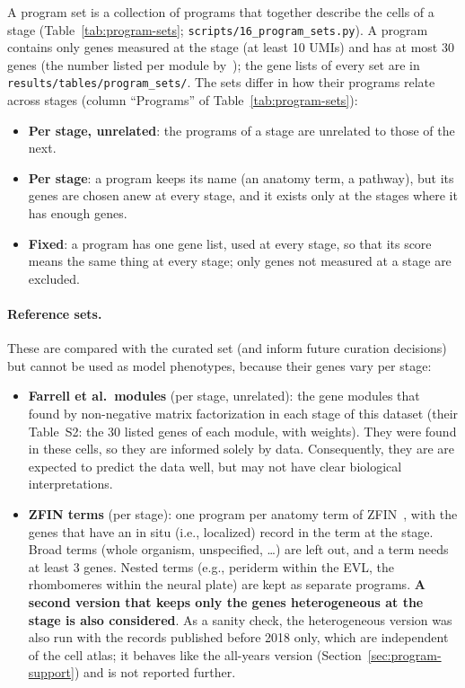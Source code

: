 \documentclass[11pt,a4paper]{article}
\begin{document}
A program set is a collection of programs that together describe the cells of a stage (Table~\ref{tab:program-sets}; \nolinkurl{scripts/16_program_sets.py}). A program contains only genes measured at the stage (at least 10 UMIs) and has at most 30 genes (the number listed per module by~\cite{farrell2018}); the gene lists of every set are in \nolinkurl{results/tables/program_sets/}. The sets differ in how their programs relate across stages (column ``Programs'' of Table~\ref{tab:program-sets}):
\begin{itemize}
	\item \textbf{Per stage, unrelated}: the programs of a stage are unrelated to those of the next.
	\item \textbf{Per stage}: a program keeps its name (an anatomy term, a pathway), but its genes are chosen anew at every stage, and it exists only at the stages where it has enough genes.
	\item \textbf{Fixed}: a program has one gene list, used at every stage, so that its score means the same thing at every stage; only genes not measured at a stage are excluded.
\end{itemize}

\paragraph{Reference sets.} These are compared with the curated set (and inform future curation decisions) but cannot be used as model phenotypes, because their genes vary per stage:
\begin{itemize}
	\item \textbf{Farrell et al.\ modules} (per stage, unrelated): the gene modules that~\cite{farrell2018} found by non-negative matrix factorization in each stage of this dataset (their Table~S2: the 30 listed genes of each module, with weights). They were found in these cells, so they are informed solely by data. Consequently, they are are expected to predict the data well, but may not have clear biological interpretations.
	\item \textbf{ZFIN terms} (per stage): one program per anatomy term of ZFIN~\cite{bradford2022zfin}, with the genes that have an in situ (i.e., localized) record in the term at the stage. Broad terms (whole organism, unspecified, \dots) are left out, and a term needs at least 3 genes. Nested terms (e.g., periderm within the EVL, the rhombomeres within the neural plate) are kept as separate programs. \textbf{A second version that keeps only the genes heterogeneous at the stage is also considered}. As a sanity check, the heterogeneous version was also run with the records published before 2018 only, which are independent of the cell atlas; it behaves like the all-years version (Section~\ref{sec:program-support}) and is not reported further.
\end{itemize}
\end{document}
